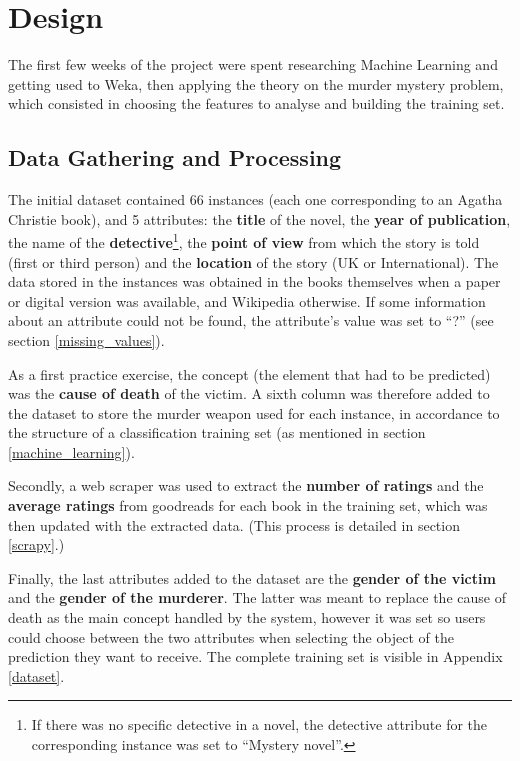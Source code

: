 \documentclass{mproj}
\begin{document}
\chapter{Design}

The first few weeks of the project were spent researching Machine Learning and getting used to Weka, then applying the theory on the murder mystery problem, which consisted in choosing the features to analyse and building the training set. \par

\section{Data Gathering and Processing}\label{data_process}

The initial dataset contained 66 instances (each one corresponding to an Agatha Christie book), and 5 attributes: the \textbf{title} of the novel, the \textbf{year of publication}, the name of the \textbf{detective}\footnote{If there was no specific detective in a novel, the detective attribute for the corresponding instance was set to ``Mystery novel''.}, the \textbf{point of view} from which the story is told (first or third person) and the \textbf{location} of the story (UK or International). The data stored in the instances was obtained in the books themselves when a paper or digital version was available, and Wikipedia otherwise. \cite{wikipedia} If some information about an attribute could not be found, the attribute's value was set to ``?'' (see section \ref{missing_values}).\par

As a first practice exercise, the concept (the element that had to be predicted) was the \textbf{cause of death} of the victim. A sixth column was therefore added to the dataset to store the murder weapon used for each instance, in accordance to the structure of a classification training set (as mentioned in section \ref{machine_learning}).\par

Secondly, a web scraper was used to extract the \textbf{number of ratings} and the \textbf{average ratings} from goodreads for each book in the training set, which was then updated with the extracted data. \cite{goodreads} (This process is detailed in section \ref{scrapy}.)\par

Finally, the last attributes added to the dataset are the \textbf{gender of the victim} and the \textbf{gender of the murderer}. The latter was meant to replace the cause of death as the main concept handled by the system, however it was set so users could choose between the two attributes when selecting the object of the prediction they want to receive. The complete training set is visible in Appendix \ref{dataset}.\par
\end{document}
